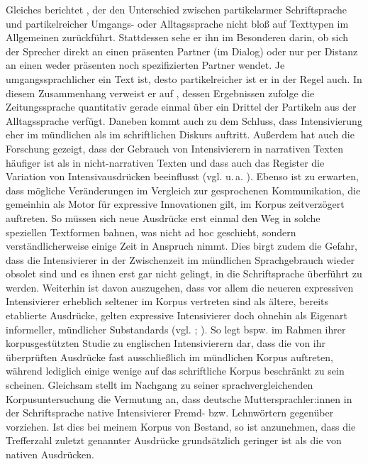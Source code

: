Gleiches berichtet \citet[12]{Helbig.1994}, der den Unterschied zwischen partikelarmer Schriftsprache und partikelreicher Umgangs- oder Alltagssprache nicht bloß auf Texttypen im Allgemeinen zurückführt. Stattdessen sehe er ihn im Besonderen darin, \glqq{}ob sich der Sprecher direkt an einen präsenten Partner (im Dialog) oder nur per Distanz an einen weder präsenten noch spezifizierten Partner wendet. \textelp{} Je umgangssprachlicher ein Text ist, desto partikelreicher ist er in der Regel auch.\grqq{} In diesem Zusammenhang verweist er auf \citet[98ff.]{Weydt.1969}, dessen Ergebnissen zufolge die Zeitungssprache quantitativ gerade einmal über ein Drittel der Partikeln aus der Alltagssprache verfügt. Daneben kommt auch \citet[451]{Darcy.2015} zu dem Schluss, dass Intensivierung eher im mündlichen als im schriftlichen Diskurs auftritt. Außerdem hat auch die Forschung gezeigt, dass der Gebrauch von Intensivierern in narrativen Texten häufiger ist als in nicht-narrativen Texten und dass auch das Register die Variation von Intensivausdrücken beeinflusst (vgl. u.\,a. \citealt[8]{Brown.2012}). Ebenso ist zu erwarten, dass mögliche Veränderungen im Vergleich zur gesprochenen Kommunikation, die gemeinhin als Motor für expressive Innovationen gilt, im Korpus zeitverzögert auftreten. So müssen sich neue Ausdrücke erst einmal den Weg in solche speziellen Textformen bahnen, was nicht ad hoc geschieht, sondern verständlicherweise einige Zeit in Anspruch nimmt. Dies birgt zudem die Gefahr, dass die Intensivierer in der Zwischenzeit im mündlichen Sprachgebrauch wieder obsolet sind und es ihnen erst gar nicht gelingt, in die Schriftsprache überführt zu werden. Weiterhin ist davon auszugehen, dass vor allem die neueren expressiven Intensivierer erheblich seltener im Korpus vertreten sind als ältere, bereits etablierte Ausdrücke, gelten expressive Intensivierer doch ohnehin als Eigenart informeller, mündlicher Substandards (vgl. \citealt[143]{Lorenz.2002}; \citealt[362]{Tagliamonte.2008}). So legt bspw. \citet[40]{Paradis.1997} im Rahmen ihrer korpusgestützten Studie zu englischen Intensivierern dar, dass die von ihr überprüften Ausdrücke fast ausschließlich im mündlichen Korpus auftreten, während lediglich einige wenige auf das schriftliche Korpus beschränkt zu sein scheinen. Gleichsam stellt \citet[323]{Calpestrati.2017} im Nachgang zu seiner sprachvergleichenden Korpusuntersuchung die Vermutung an, dass deutsche Muttersprachler:innen in der Schriftsprache native Intensivierer Fremd- bzw. Lehnwörtern gegenüber vorziehen. Ist dies bei meinem Korpus von Bestand, so ist anzunehmen, dass die Trefferzahl zuletzt genannter Ausdrücke grundsätzlich geringer ist als die von nativen Ausdrücken.

